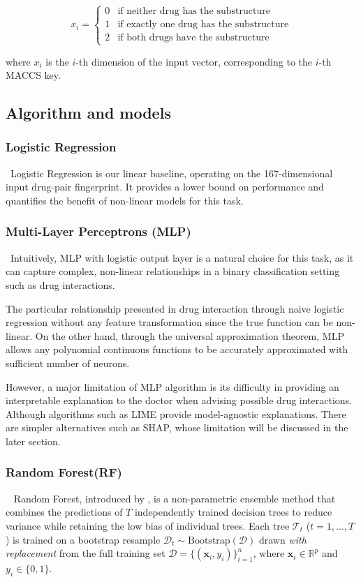 \documentclass[letterpaper]{article} %
\begin{document}
\begin{equation}
    x_i = \begin{cases}
        0 & \text{if neither drug has the substructure} \\
        1 & \text{if exactly one drug has the substructure} \\
        2 & \text{if both drugs have the substructure} 
        \end{cases}
\end{equation}

where $x_i$ is the $i$-th dimension of the input vector, corresponding to the $i$-th MACCS key. 

\subsection{Algorithm and models}

\subsubsection{Logistic Regression}
\
Logistic Regression is our linear baseline, operating on the 167-dimensional input drug-pair fingerprint. It provides a lower bound on performance and quantifies the benefit of non-linear models for this task.

\subsubsection{Multi-Layer Perceptrons (MLP)}
\ 
Intuitively, MLP with logistic output layer is a natural choice for this task, as it can capture complex, non-linear relationships in a binary classification setting such as drug interactions.

The particular relationship presented in drug interaction through naive logistic regression without any feature transformation since the true function can be non-linear. On the other hand, through the universal approximation theorem, MLP allows any polynomial continuous functions to be accurately approximated with sufficient number of neurons.

However, a major limitation of MLP algorithm is its difficulty in providing an interpretable explanation to the doctor when advising possible drug interactions. Although algorithms such as LIME provide model-agnostic explanations. There are simpler alternatives such as SHAP, whose limitation will be discussed in the later section.

\subsubsection{Random Forest(RF)}
\
\newline
Random Forest, introduced by \citet{Breiman2001}, is a non-parametric ensemble method that combines the predictions of $T$ independently trained decision trees to reduce variance while retaining the low bias of individual trees. Each tree $\mathcal{T}_t$ ($t = 1, \ldots, T$) is trained on a bootstrap resample $\mathcal{D}_t \sim \text{Bootstrap}(\mathcal{D})$ drawn \emph{with replacement} from the full training set $\mathcal{D} = \{(\mathbf{x}_i, y_i)\}_{i=1}^{n}$, where $\mathbf{x}_i \in \mathbb{R}^{p}$ and $y_i \in \{0, 1\}$.
 
\end{document}
